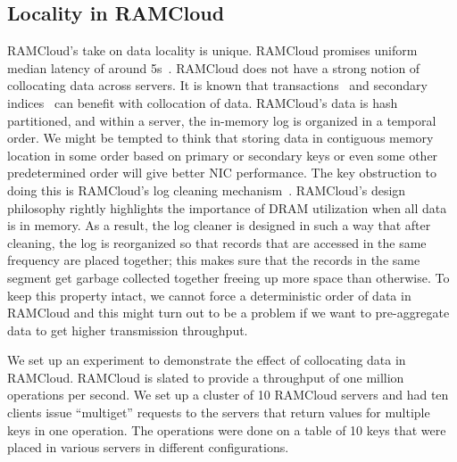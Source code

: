 \subsection{Locality in RAMCloud}
RAMCloud's take on data locality is unique. RAMCloud promises uniform median latency of around 5\textmu s~\cite{ramcloud}. RAMCloud does not have a strong notion of collocating data across servers. 
It is known that transactions~\cite{ramcloudtx} and secondary indices~\cite{slik} can benefit with collocation of data. RAMCloud's data is hash partitioned, and within a server, the in-memory log is organized 
in a temporal order. We might be tempted to think that storing data in contiguous memory location in some order based on primary or secondary keys or even some other predetermined order will give better NIC performance. 
The key obstruction to doing this is RAMCloud's log cleaning mechanism~\cite{ramcloudfast}. RAMCloud's design philosophy rightly highlights the importance of DRAM utilization when all data is in memory. 
As a result, the log cleaner is designed in such a way that after cleaning, the log is reorganized so that records that are accessed in the same frequency are placed together; this makes sure that the records in the same 
segment get garbage collected together freeing up more space than otherwise. To keep this property intact, we cannot force a deterministic order of data in RAMCloud and this might turn out to be a problem if 
we want to pre-aggregate data to get higher transmission throughput.

We set up an experiment to demonstrate the effect of collocating data in RAMCloud. RAMCloud is slated to provide a throughput of one million operations per second. We set up a cluster of 10 RAMCloud servers 
and had ten clients issue ``multiget'' requests to the servers that return values for multiple keys in one operation. The operations were done on a table of 10 keys that were placed in various servers in different 
configurations. 

